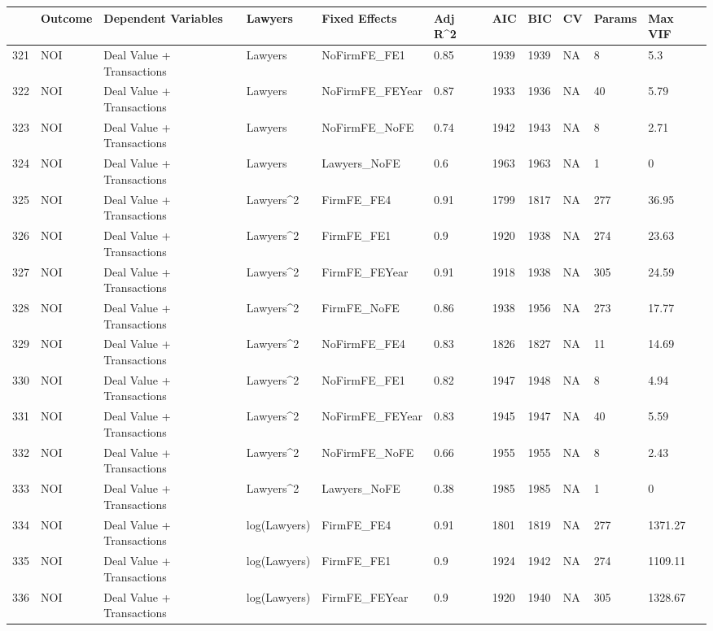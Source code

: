 \documentclass{article}
\begin{document}
\begin{table}[H]
\centering
\begin{tabular}{rllllllllll}
  \hline
 & Outcome & Dependent Variables & Lawyers & Fixed Effects & Adj R^2 & AIC & BIC & CV & Params & Max VIF \\ 
  \hline
321 & NOI & Deal Value + Transactions & Lawyers & NoFirmFE\_FE1 & 0.85 & 1939 & 1939 & NA & 8 & 5.3 \\ 
  322 & NOI & Deal Value + Transactions & Lawyers & NoFirmFE\_FEYear & 0.87 & 1933 & 1936 & NA & 40 & 5.79 \\ 
  323 & NOI & Deal Value + Transactions & Lawyers & NoFirmFE\_NoFE & 0.74 & 1942 & 1943 & NA & 8 & 2.71 \\ 
  324 & NOI & Deal Value + Transactions & Lawyers & Lawyers\_NoFE & 0.6 & 1963 & 1963 & NA & 1 & 0 \\ 
  325 & NOI & Deal Value + Transactions & Lawyers^2 & FirmFE\_FE4 & 0.91 & 1799 & 1817 & NA & 277 & 36.95 \\ 
  326 & NOI & Deal Value + Transactions & Lawyers^2 & FirmFE\_FE1 & 0.9 & 1920 & 1938 & NA & 274 & 23.63 \\ 
  327 & NOI & Deal Value + Transactions & Lawyers^2 & FirmFE\_FEYear & 0.91 & 1918 & 1938 & NA & 305 & 24.59 \\ 
  328 & NOI & Deal Value + Transactions & Lawyers^2 & FirmFE\_NoFE & 0.86 & 1938 & 1956 & NA & 273 & 17.77 \\ 
  329 & NOI & Deal Value + Transactions & Lawyers^2 & NoFirmFE\_FE4 & 0.83 & 1826 & 1827 & NA & 11 & 14.69 \\ 
  330 & NOI & Deal Value + Transactions & Lawyers^2 & NoFirmFE\_FE1 & 0.82 & 1947 & 1948 & NA & 8 & 4.94 \\ 
  331 & NOI & Deal Value + Transactions & Lawyers^2 & NoFirmFE\_FEYear & 0.83 & 1945 & 1947 & NA & 40 & 5.59 \\ 
  332 & NOI & Deal Value + Transactions & Lawyers^2 & NoFirmFE\_NoFE & 0.66 & 1955 & 1955 & NA & 8 & 2.43 \\ 
  333 & NOI & Deal Value + Transactions & Lawyers^2 & Lawyers\_NoFE & 0.38 & 1985 & 1985 & NA & 1 & 0 \\ 
  334 & NOI & Deal Value + Transactions & log(Lawyers) & FirmFE\_FE4 & 0.91 & 1801 & 1819 & NA & 277 & 1371.27 \\ 
  335 & NOI & Deal Value + Transactions & log(Lawyers) & FirmFE\_FE1 & 0.9 & 1924 & 1942 & NA & 274 & 1109.11 \\ 
  336 & NOI & Deal Value + Transactions & log(Lawyers) & FirmFE\_FEYear & 0.9 & 1920 & 1940 & NA & 305 & 1328.67 \\ 

\end{tabular}
\end{table}
\end{document}

